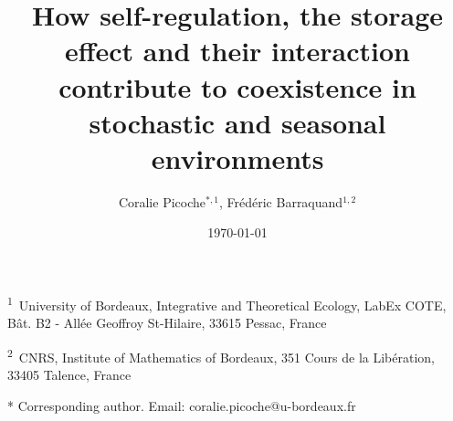 \documentclass[a4paper,12pt]{article}
\begin{document}
\title{\Huge How self-regulation, the storage effect and their interaction contribute
to coexistence in stochastic and seasonal environments}
\date{\today}
\author{\Large Coralie Picoche$^{*,1}$, Fr\'ed\'eric Barraquand$^{1,2}$}

\maketitle
 
{\large{}}\textsuperscript{{\large{}1}}{\large{}~University of
Bordeaux, Integrative and Theoretical Ecology, LabEx COTE, Bât. B2
- Allée Geoffroy St-Hilaire, 33615 Pessac, France \bigskip{}
}{\large\par}

{\large{}}\textsuperscript{{\large{}2}}{\large{}~CNRS, Institute
of Mathematics of Bordeaux, 351 Cours de la Libération, 33405 Talence,
France}{\large\par}

{\large{}\bigskip{}
}{\large\par}

{\large{}\bigskip{}
}{\large\par}

{\large{}\bigskip{}
}{\large\par}

{\large{}\bigskip{}
}{\large\par}

{*} Corresponding author. Email: coralie.picoche@u-bordeaux.fr
 
\end{document}
